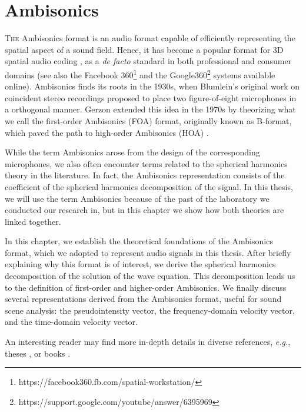 
\chapter{Ambisonics}
\label{chap:ambisonics}


\lettrine{T}{he} Ambisonics format is an audio format capable of efficiently representing the spatial aspect of a sound field. Hence, it has become a popular format for 3D spatial audio coding \cite{pulkki_parametric_2018}, as a \emph{de facto} standard in both professional and consumer domains \cite{herre_mpeg-h_2014} (see also the Facebook 360\footnote{https://facebook360.fb.com/spatial-workstation/} and the Google360\footnote{https://support.google.com/youtube/answer/6395969} systems available online).
Ambisonics finds its roots in the 1930s, when Blumlein's original work \cite{blumlein_improvements_1931} on coincident stereo recordings proposed to place two figure-of-eight microphones in a orthogonal manner. Gerzon \cite{gerzon_periphony_1973} extended this idea in the 1970s by theorizing what we call the first-order Ambisonics (FOA) format, originally known as B-format, which paved the path to high-order Ambisonics (HOA) \cite{daniel_representation_2001}.

While the term Ambisonics arose from the design of the corresponding microphones, we also often encounter terms related to the spherical harmonics theory in the literature. In fact, the Ambisonics representation consists of the coefficient of the spherical harmonics decomposition of the signal. In this thesis, we will use the term Ambisonics because of the past of the laboratory we conducted our research in, but in this chapter we show how both theories are linked together.

In this chapter, we establish the theoretical foundations of the Ambisonics format, which we adopted to represent audio signals in this thesis. After briefly explaining why this format is of interest, we derive the spherical harmonics decomposition of the solution of the wave equation. This decomposition leads us to the definition of first-order and higher-order Ambisonics. We finally discuss several representations derived from the Ambisonics format, useful for sound scene analysis: the pseudointensity vector, the frequency-domain velocity vector, and the time-domain velocity vector.

An interesting reader may find more in-depth details in diverse references, \emph{e.g.}, theses \cite{daniel_representation_2001,merimaa_analysis_2006,baque_analyse_2017,moreau_etude_2006}, or books \cite{zotter_ambisonics_2019, rafaely_fundamentals_2019, jarrett_theory_2017, williams_fourier_2000}.

